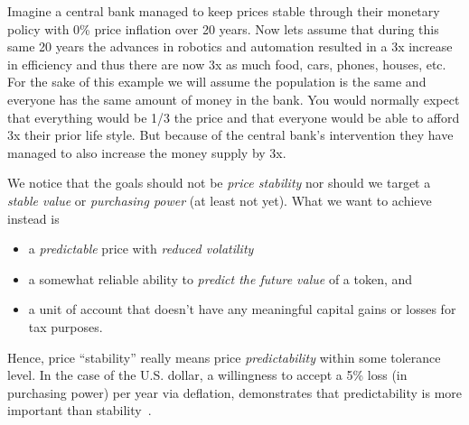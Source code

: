 Imagine a central bank managed to keep prices stable through their monetary
policy with 0\% price inflation over 20 years. Now lets assume that during this
same 20 years the advances in robotics and automation resulted in a 3x increase
in efficiency and thus there are now 3x as much food, cars, phones, houses,
etc. For the sake of this example we will assume the population is the same and
everyone has the same amount of money in the bank. You would normally expect
that everything would be 1/3 the price and that everyone would be able to
afford 3x their prior life style. But because of the central bank's
intervention they have managed to also increase the money supply by 3x.


We notice that the goals should not be \emph{price stability} nor should we
target a \emph{stable value} or \emph{purchasing power} (at least not yet). 
%
What we want to achieve instead is 
\begin{itemize}
 \item a \emph{predictable} price with \emph{reduced volatility}
 \item a somewhat reliable ability to \emph{predict the future value} of a token, and
 \item a unit of account that doesn't have any meaningful capital gains or
       losses for tax purposes.
\end{itemize}

Hence, price ``stability'' really means price \emph{predictability} within some
tolerance level. In the case of the U.S. dollar, a willingness to accept a 5\%
loss (in purchasing power) per year via deflation, demonstrates that
predictability is more important than stability~\cite{bm:stable:impossible}.
